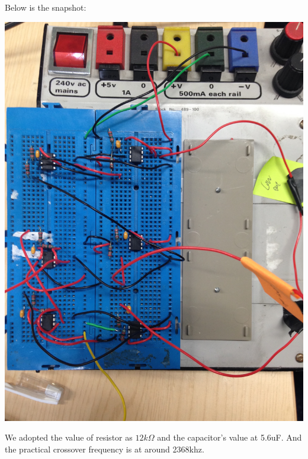 \documentclass[11pt]{scrartcl}
\begin{document}
Below is the snapshot:
\begin{center}
\begin{minipage}[t]{\linewidth}

{
\includegraphics[scale = 0.1]{1383.JPG}
}
\end{minipage}
\medskip
\end{center}

We adopted the value of resistor as $12k\Omega$ and the capacitor's value at 5.6uF. And the practical crossover frequency is at around 2368khz.
\end{document}
